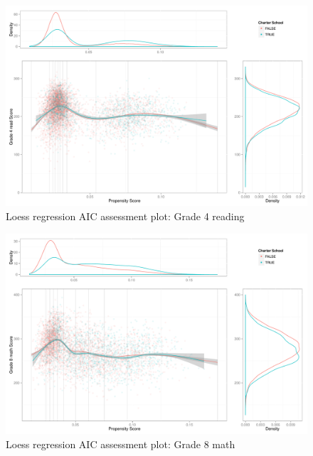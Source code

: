 \begin{figure}[h!]
\begin{center}
\includegraphics[height=.4\textheight]{../Figures2009/g4read-loessAIC.pdf}
\caption{Loess regression AIC assessment plot: Grade 4 reading}
\label{fig:g4read:loess}
\end{center}
\end{figure}

\begin{figure}[h!]
\begin{center}
\includegraphics[height=.4\textheight]{../Figures2009/g8math-loessAIC.pdf}
\caption{Loess regression AIC assessment plot: Grade 8 math}
\label{fig:g8math:loess}
\end{center}
\end{figure}

